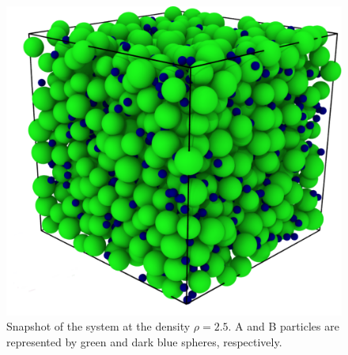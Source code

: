 \begin{figure}
\centering
\includegraphics[width=12cm]{figs/fig6p1.pdf}
\caption{Snapshot of the system at the density $\rho = 2.5$. A and
B particles are represented by green and dark blue spheres, respectively.
\label{fig6p1}}
\end{figure}

